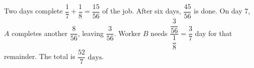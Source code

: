 Two days complete $\dfrac{1}{7}+\dfrac{1}{8}=\dfrac{15}{56}$ of the job. After six days, $\dfrac{45}{56}$ is done. On day 7, $A$ completes another $\dfrac{8}{56}$, leaving $\dfrac{3}{56}$. Worker $B$ needs $\dfrac{\dfrac{3}{56}}{\dfrac{1}{8}}=\dfrac{3}{7}$ day for that remainder. The total is $\boxed{\dfrac{52}{7}\text{ days}}$.
